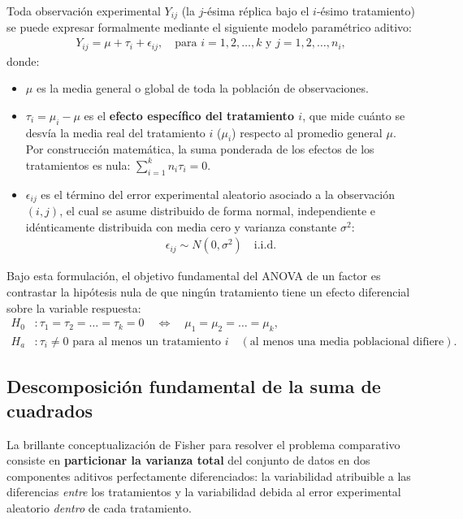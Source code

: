 Toda observación experimental $Y_{ij}$ (la $j$-ésima réplica bajo el $i$-ésimo tratamiento) se puede expresar formalmente mediante el siguiente modelo paramétrico aditivo:
\begin{align}
	Y_{ij} = \mu + \tau_i + \epsilon_{ij}, \quad \text{para } i = 1, 2, \ldots, k \text{ y } j = 1, 2, \ldots, n_i,
	\label{eq:modelo_anova1}
\end{align}
donde:
\begin{itemize}
	\item $\mu$ es la media general o global de toda la población de observaciones.
	\item $\tau_i = \mu_i - \mu$ es el \textbf{efecto específico del tratamiento $i$}, que mide cuánto se desvía la media real del tratamiento $i$ ($\mu_i$) respecto al promedio general $\mu$. Por construcción matemática, la suma ponderada de los efectos de los tratamientos es nula: $\sum_{i=1}^k n_i \tau_i = 0$.
	\item $\epsilon_{ij}$ es el término del error experimental aleatorio asociado a la observación $(i,j)$, el cual se asume distribuido de forma normal, independiente e idénticamente distribuida con media cero y varianza constante $\sigma^2$:
	\begin{align}
		\epsilon_{ij} \sim N(0, \sigma^2) \quad \text{i.i.d.}
	\end{align}
\end{itemize}

Bajo esta formulación, el objetivo fundamental del ANOVA de un factor es contrastar la hipótesis nula de que ningún tratamiento tiene un efecto diferencial sobre la variable respuesta:
\begin{align}
	H_0&: \tau_1 = \tau_2 = \ldots = \tau_k = 0 \quad \Longleftrightarrow \quad \mu_1 = \mu_2 = \ldots = \mu_k, \\
	H_a&: \tau_i \neq 0 \text{ para al menos un tratamiento } i \quad (\text{al menos una media poblacional difiere}).
\end{align}

\subsection{Descomposición fundamental de la suma de cuadrados}

La brillante conceptualización de Fisher para resolver el problema comparativo consiste en \textbf{particionar la varianza total} del conjunto de datos en dos componentes aditivos perfectamente diferenciados: la variabilidad atribuible a las diferencias \emph{entre} los tratamientos y la variabilidad debida al error experimental aleatorio \emph{dentro} de cada tratamiento.

